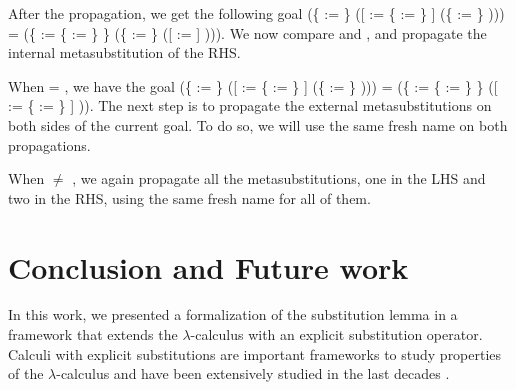 After the propagation, we get the following goal (\{ := \} ([ := \{ := \} ] (\{ := \}    ))) = (\{ := \{ := \} \} (\{ := \} ([ := ] ))). We now compare  and , and propagate the internal metasubstitution of the RHS.
\begin{coqdoccode}
\end{coqdoccode}
When  = , we have the goal (\{ := \} ([ := \{ := \} ] (\{ := \}    ))) = (\{ := \{ := \} \} ([ := \{ := \} ] )). The next step is to propagate the external metasubstitutions on both sides of the current goal. To do so, we will use the same fresh name  on both propagations.\begin{coqdoccode}
 \end{coqdoccode}
When  \ensuremath{\not=} , we again propagate all the metasubstitutions, one in the LHS and two in the RHS, using the same fresh name  for all of them.\begin{coqdoccode}
 \coqdocemptyline
\end{coqdoccode}
\section{Conclusion and Future work}



 In this work, we presented a formalization of the substitution lemma in a framework that extends the $\lambda$-calculus with an explicit substitution operator. Calculi with explicit substitutions are important frameworks to study properties of the $\lambda$-calculus and have been extensively studied in the last decades \cite{abadiExplicitSubstitutions1991,accattoliAbstractFactorizationTheorem2012,ayala-rinconComparingCalculiExplicit2002,ayala-rinconComparingImplementingCalculi2005,bonelliPerpetualityNamedLambda2001,fujitaChurchRosserTheoremCompositional2016}. 



